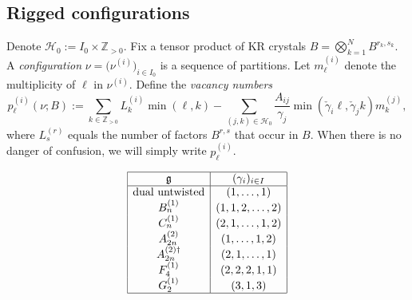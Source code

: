 \documentclass[reqno]{amsart}
\newcommand{\g}{\mathfrak{g}}
\newcommand{\HH}{\mathcal{H}}
\newcommand{\modgamma}{\check{\gamma}} %
\newcommand{\ZZ}{\mathbb{Z}}
\newcommand{\defn}[1]{{\color{darkred}\emph{#1}}} %
\theoremstyle{plain}
\theoremstyle{definition}
\numberwithin{equation}{section}
\begin{document}
\subsection{Rigged configurations}
%
Denote $\HH_0 := I_0 \times \ZZ_{>0}$. Fix a tensor product of KR crystals $B = \bigotimes_{k=1}^N B^{r_k, s_k}$.
A \defn{configuration} $\nu = \bigl(\nu^{(i)}\bigr)_{i \in I_0}$ is a sequence of partitions.
Let $m_{\ell}^{(i)}$ denote the multiplicity of $\ell$ in $\nu^{(i)}$.
Define the \defn{vacancy numbers}
\begin{equation}
\label{eq:vacancy}
p_{\ell}^{(i)}(\nu; B) := \sum_{k \in \ZZ_{>0}} L_k^{(i)} \min(\ell, k) - \sum_{(j,k) \in \HH_0} \frac{A_{ij}}{\gamma_j} \min(\modgamma_i \ell, \modgamma_j k) m_k^{(j)},
\end{equation}
where $L_s^{(r)}$ equals the number of factors $B^{r,s}$ that occur in $B$.
When there is no danger of confusion, we will simply write $p_{\ell}^{(i)}$.

\begin{table}
\[
\begin{array}{|c|c|}
\hline
\g & (\gamma_i)_{i \in I} \\\hline
\text{dual untwisted}  & (1,\dotsc,1) \\
B_n^{(1)} & (1, 1, 2, \dotsc, 2) \\
C_n^{(1)} & (2, 1, \dotsc,1, 2) \\
A_{2n}^{(2)} & (1, \dotsc, 1, 2) \\
A_{2n}^{(2)\dagger} & (2, 1, \dotsc, 1) \\
F_4^{(1)} & (2, 2, 2, 1, 1) \\
G_2^{(1)} & (3, 1, 3) \\\hline
\end{array}
\]
\caption{The factors $(\gamma_i)_{i \in I}$.}
\label{table:scaling_factors}
\end{table}
\end{document}
